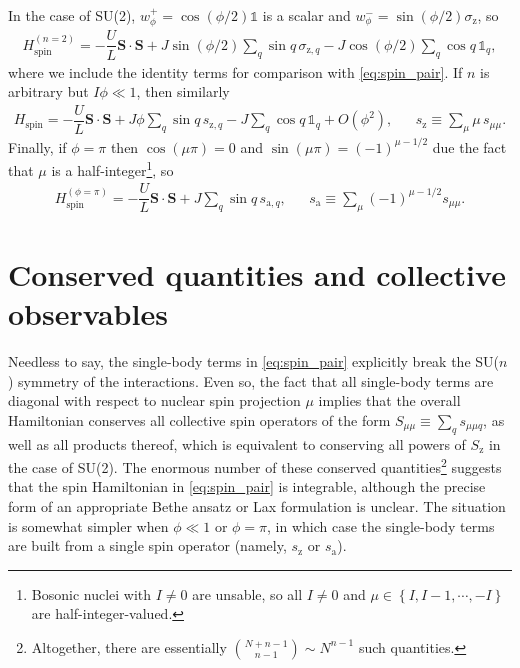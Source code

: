 \documentclass[nofootinbib,notitlepage,11pt]{revtex4-2}
\renewcommand{\t}{\text} %
\newcommand{\f}[2]{\dfrac{#1}{#2}} %
\newcommand{\p}[1]{\left(#1\right)} %
\renewcommand{\set}[1]{\left\{#1\right\}} %
\renewcommand{\v}{\bm} %
\renewcommand{\c}{\cdot} %
\newcommand{\1}{\mathds{1}}
\renewcommand{\a}{\text{a}}
\newcommand{\z}{\text{z}}
\begin{document}
In the case of SU(2), $w_\phi^+=\cos\p{\phi/2}\1$ is a scalar and $w_\phi^-=\sin\p{\phi/2}\sigma_\z$, so
\begin{align}
  H_{\t{spin}}^{(n=2)} = -\f{U}{L} \v S\c\v S
  + J \sin\p{\phi/2} \sum_q \sin q\, \sigma_{\z,q}
  - J \cos\p{\phi/2} \sum_q \cos q\, \1_q,
\end{align}
where we include the identity terms for comparison with \eqref{eq:spin_pair}.
If $n$ is arbitrary but $I\phi\ll1$, then similarly
\begin{align}
  H_{\t{spin}} = -\f{U}{L} \v S\c\v S
  + J \phi \sum_q \sin q\, s_{\z,q}
  - J \sum_q \cos q\, \1_q + O(\phi^2),
  &&
  s_\z \equiv \sum_\mu \mu\, s_{\mu\mu}.
\end{align}
Finally, if $\phi=\pi$ then $\cos\p{\mu\pi}=0$ and $\sin\p{\mu\pi}=\p{-1}^{\mu-1/2}$ due the fact that $\mu$ is a half-integer\footnote{Bosonic nuclei with $I\ne0$ are unsable, so all $I\ne0$ and $\mu\in\set{I,I-1,\cdots,-I}$ are half-integer-valued.}, so
\begin{align}
  H_{\t{spin}}^{(\phi=\pi)} = -\f{U}{L} \v S\c\v S
  + J \sum_q \sin q\, s_{\a,q},
  &&
  s_\a \equiv \sum_\mu \p{-1}^{\mu-1/2} s_{\mu\mu}.
  \label{eq:spin_pi}
\end{align}

\section{Conserved quantities and collective observables}

Needless to say, the single-body terms in \eqref{eq:spin_pair} explicitly break the SU($n$) symmetry of the interactions.
Even so, the fact that all single-body terms are diagonal with respect to nuclear spin projection $\mu$ implies that the overall Hamiltonian conserves all collective spin operators of the form $S_{\mu\mu}\equiv\sum_q s_{\mu\mu q}$, as well as all products thereof, which is equivalent to conserving all powers of $S_\z$ in the case of SU(2).
The enormous number of these conserved quantities\footnote{Altogether, there are essentially ${N+n-1 \choose n-1}\sim N^{n-1}$ such quantities.} suggests that the spin Hamiltonian in \eqref{eq:spin_pair} is integrable, although the precise form of an appropriate Bethe ansatz or Lax formulation is unclear.
The situation is somewhat simpler when $\phi\ll1$ or $\phi=\pi$, in which case the single-body terms are built from a single spin operator (namely, $s_\z$ or $s_\a$).
\end{document}
